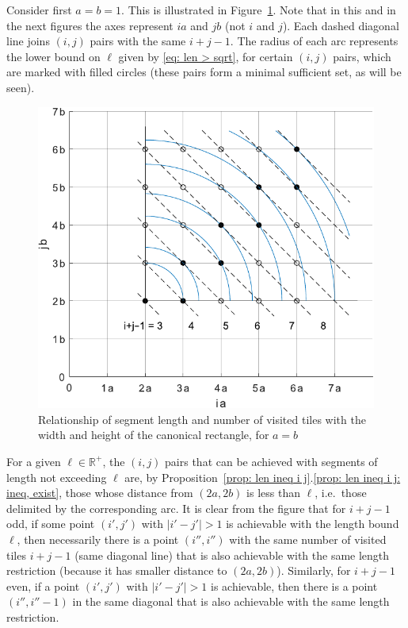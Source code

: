 \documentclass[12pt, a4paper]{article}
\newcommand{\len}{\ell} %
\newcommand{\mss}{M}
\begin{document}

Consider first $a=b=1$. This is illustrated in Figure~\ref{fig: ijLS_1}. Note that in this and in the next figures the axes represent $ia$ and $jb$ (not $i$ and $j$). Each dashed diagonal line joins $(i, j)$ pairs with the same $i+j-1$. The radius of each arc represents the lower bound on $\len$ given by \eqref{eq: len > sqrt}, for certain $(i,j)$ pairs, which are marked with filled circles (these pairs form a minimal sufficient set, as will be seen).

\begin{figure}
\centering%
\includegraphics[width=.7\textwidth]{ijLS_1}%
\caption{Relationship of segment length and number of visited tiles with the width and height of the canonical rectangle, for $a=b$
}%
\label{fig: ijLS_1}%
\end{figure}%

For a given $\len \in \mathbb R^+$, the $(i,j)$ pairs that can be achieved with segments of length not exceeding $\len$ are, by Proposition~\ref{prop: len ineq i j}.\ref{prop: len ineq i j: ineq, exist}, those whose distance from $(2a,2b)$ is less than $\len$, i.e.~those delimited by the corresponding arc. It is clear from the figure that for $i+j-1$ odd, if some point $(i',j')$ with $|i'-j'|>1$ is achievable with the length bound $\len$, then necessarily there is a point $(i'',i'')$ with the same number of visited tiles $i+j-1$ (same diagonal line) that is also achievable with the same length restriction (because it has smaller distance to $(2a,2b)$). Similarly, for $i+j-1$ even, if a point $(i',j')$ with $|i'-j'|>1$ is achievable, then there is a point $(i'',i''-1)$ in the same diagonal that is also achievable with the same length restriction.
\end{document}
